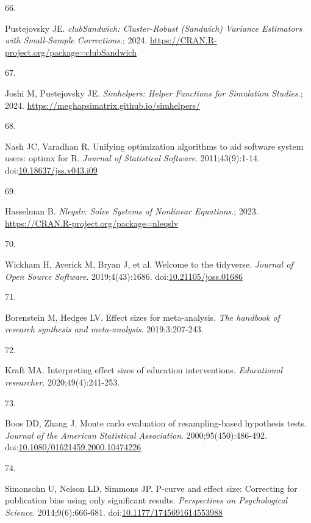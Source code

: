 \documentclass[
  american,
  man, donotrepeattitle,floatsintext]{apa7}
\newlength{\cslhangindent}
\newlength{\csllabelwidth}
\newenvironment{CSLReferences}[2] %
 {\begin{list}{}{%
  \setlength{\itemindent}{0pt}
  \setlength{\leftmargin}{0pt}
  \setlength{\parsep}{0pt}
  \ifodd #1
   \setlength{\leftmargin}{\cslhangindent}
   \setlength{\itemindent}{-1\cslhangindent}
  \fi
  \setlength{\itemsep}{#2\baselineskip}}}
 {\end{list}}
\newcommand{\CSLLeftMargin}[1]{\parbox[t]{\csllabelwidth}{\strut#1\strut}}
\newcommand{\CSLRightInline}[1]{\parbox[t]{\linewidth - \csllabelwidth}{\strut#1\strut}}
\begin{document}
\begin{CSLReferences}{0}{1}
\CSLLeftMargin{66. }%
\CSLRightInline{Pustejovsky JE. \emph{clubSandwich: Cluster-Robust (Sandwich) Variance Estimators with Small-Sample Corrections}.; 2024. \url{https://CRAN.R-project.org/package=clubSandwich}}

\CSLLeftMargin{67. }%
\CSLRightInline{Joshi M, Pustejovsky JE. \emph{Simhelpers: Helper Functions for Simulation Studies}.; 2024. \url{https://meghapsimatrix.github.io/simhelpers/}}

\CSLLeftMargin{68. }%
\CSLRightInline{Nash JC, Varadhan R. Unifying optimization algorithms to aid software system users: {optimx} for {R}. \emph{Journal of Statistical Software}. 2011;43(9):1-14. doi:\href{https://doi.org/10.18637/jss.v043.i09}{10.18637/jss.v043.i09}}

\CSLLeftMargin{69. }%
\CSLRightInline{Hasselman B. \emph{Nleqslv: Solve Systems of Nonlinear Equations}.; 2023. \url{https://CRAN.R-project.org/package=nleqslv}}

\CSLLeftMargin{70. }%
\CSLRightInline{Wickham H, Averick M, Bryan J, et al. Welcome to the {tidyverse}. \emph{Journal of Open Source Software}. 2019;4(43):1686. doi:\href{https://doi.org/10.21105/joss.01686}{10.21105/joss.01686}}

\CSLLeftMargin{71. }%
\CSLRightInline{Borenstein M, Hedges LV. Effect sizes for meta-analysis. \emph{The handbook of research synthesis and meta-analysis}. 2019;3:207-243.}

\CSLLeftMargin{72. }%
\CSLRightInline{Kraft MA. Interpreting effect sizes of education interventions. \emph{Educational researcher}. 2020;49(4):241-253.}

\CSLLeftMargin{73. }%
\CSLRightInline{Boos DD, Zhang J. Monte carlo evaluation of resampling-based hypothesis tests. \emph{Journal of the American Statistical Association}. 2000;95(450):486-492. doi:\href{https://doi.org/10.1080/01621459.2000.10474226}{10.1080/01621459.2000.10474226}}

\CSLLeftMargin{74. }%
\CSLRightInline{Simonsohn U, Nelson LD, Simmons JP. P-curve and effect size: Correcting for publication bias using only significant results. \emph{Perspectives on Psychological Science}. 2014;9(6):666-681. doi:\href{https://doi.org/10.1177/1745691614553988}{10.1177/1745691614553988}}


\end{CSLReferences}
\end{document}
